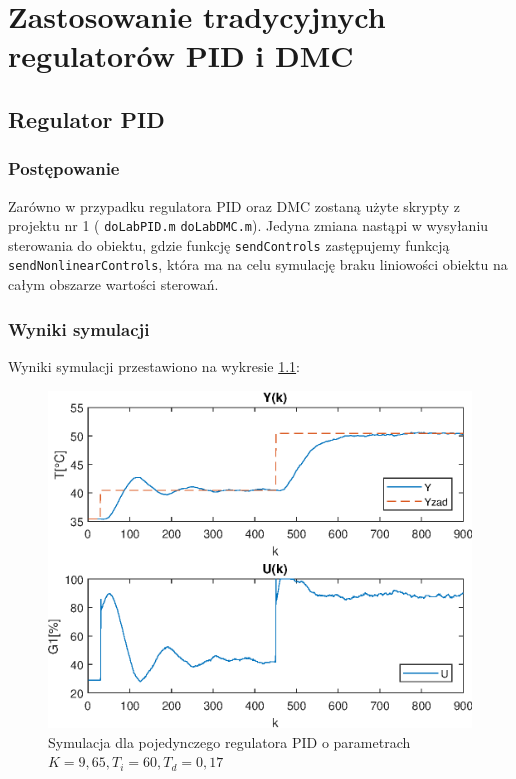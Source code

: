 \chapter{Zastosowanie tradycyjnych regulatorów PID i DMC}




\section{Regulator PID}

\subsection{Postępowanie}

Zarówno w przypadku regulatora PID oraz DMC zostaną użyte skrypty z projektu nr 1 ( \verb|doLabPID.m|  \verb|doLabDMC.m|). Jedyna zmiana nastąpi w wysyłaniu sterowania do obiektu, gdzie funkcję \verb|sendControls| zastępujemy funkcją \verb|sendNonlinearControls|, która ma na celu symulację braku liniowości obiektu na całym obszarze wartości sterowań. 

\subsection{Wyniki symulacji}

Wyniki symulacji przestawiono na wykresie \ref{naiwnyPID}:

\begin{figure}[h!]
	\centering
	\includegraphics[scale=1]{Rys/NaiwnyPID.eps}
	\caption{Symulacja dla pojedynczego regulatora PID o parametrach $K=9,65, T_{i}=60,  T_{d}=0,17 $}
	\label{naiwnyPID}
\end{figure}


